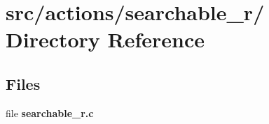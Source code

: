 \hypertarget{dir_000040}{
\section{src/actions/searchable\_\-r/ Directory Reference}
\label{dir_000040}
}
\subsection*{Files}
\begin{CompactItemize}
\item 
file {\bf searchable\_\-r.c}
\end{CompactItemize}
